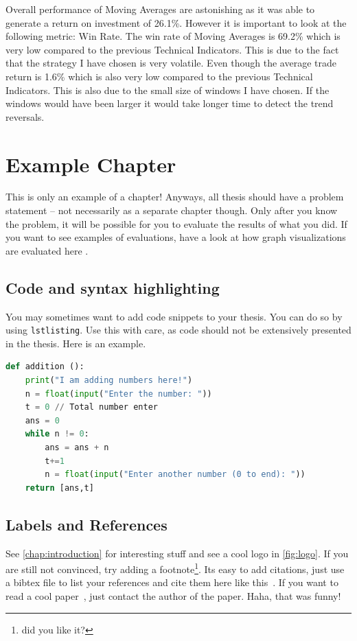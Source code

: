 \documentclass{imc-inf}
\begin{document}
				Overall performance of Moving Averages are astonishing as it was able to generate a return on investment of 26.1\%. However it is important to look at the following 
				metric: Win Rate. The win rate of Moving Averages is 69.2\% which is very low compared to the previous Technical Indicators. This is due to the fact that the strategy I have 
				chosen is very volatile. Even though the average trade return is 1.6\% which is also very low compared to the previous Technical Indicators. This is also due to the small size 
				of windows I have chosen. If the windows would have been larger it would take longer time to detect the trend reversals.
	



\chapter{Example Chapter}
This is only an example of a chapter! Anyways, all thesis should have a problem statement -- not necessarily as a separate chapter though.
 Only after you know the problem, it will be possible for you to evaluate the results of what you did. If you want to see examples of evaluations,
  have a look at how graph visualizations are evaluated here \cite{DBLP:journals/access/BurchHWPWH21}. 

\section{Code and syntax highlighting}

You may sometimes want to add code snippets to your thesis. You can do so by using \texttt{lstlisting}. Use this with care, as code should not be extensively presented in the thesis. Here is an example. 

\begin{lstlisting}[language=Python]
def addition ():
    print("I am adding numbers here!")
    n = float(input("Enter the number: "))
    t = 0 // Total number enter
    ans = 0
    while n != 0:
        ans = ans + n
        t+=1
        n = float(input("Enter another number (0 to end): "))
    return [ans,t]
\end{lstlisting}

\section{Labels and References}
See \autoref{chap:introduction} for interesting stuff and see a cool logo in \autoref{fig:logo}. If you are still not convinced, try adding a footnote\footnote{did you like it?}. Its easy to add citations, just use a bibtex file to list your references and cite them here like this~\cite{988366}. If you want to read a cool paper~\cite{DBLP:conf/euromicro/DhunganaHW20}, just contact the author of the paper. Haha, that was funny! 
\end{document}
